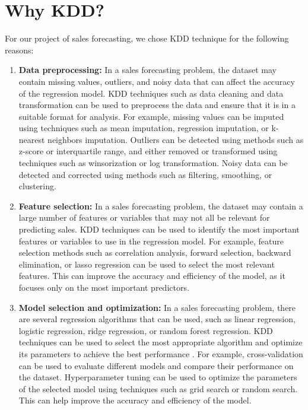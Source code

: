 \section{Why KDD?}

For our project of sales forecasting, we chose KDD technique for the following reasons:

\begin{enumerate}
	\item \textbf{Data preprocessing:} In a sales forecasting problem, the dataset may contain missing values, outliers, and noisy data that can affect the accuracy of the regression model. KDD techniques such as data cleaning and data transformation can be used to preprocess the data and ensure that it is in a suitable format for analysis. For example, missing values can be imputed using techniques such as mean imputation, regression imputation, or k-nearest neighbors imputation. Outliers can be detected using methods such as z-score or interquartile range, and either removed or transformed using techniques such as winsorization or log transformation. Noisy data can be detected and corrected using methods such as filtering, smoothing, or clustering.

	\item \textbf{Feature selection:} In a sales forecasting problem, the dataset may contain a large number of features or variables that may not all be relevant for predicting sales. KDD techniques can be used to identify the most important features or variables to use in the regression model. For example, feature selection methods such as correlation analysis, forward selection, backward elimination, or lasso regression can be used to select the most relevant features. This can improve the accuracy and efficiency of the model, as it focuses only on the most important predictors.

	\item \textbf{Model selection and optimization:} In a sales forecasting problem, there are several regression algorithms that can be used, such as linear regression, logistic regression, ridge regression, or random forest regression. KDD techniques can be used to select the most appropriate algorithm and optimize its parameters to achieve the best performance  \cite{Azevedo:2008}. For example, cross-validation can be used to evaluate different models and compare their performance on the dataset. Hyperparameter tuning can be used to optimize the parameters of the selected model using techniques such as grid search or random search. This can help improve the accuracy and efficiency of the model.


\end{enumerate}
